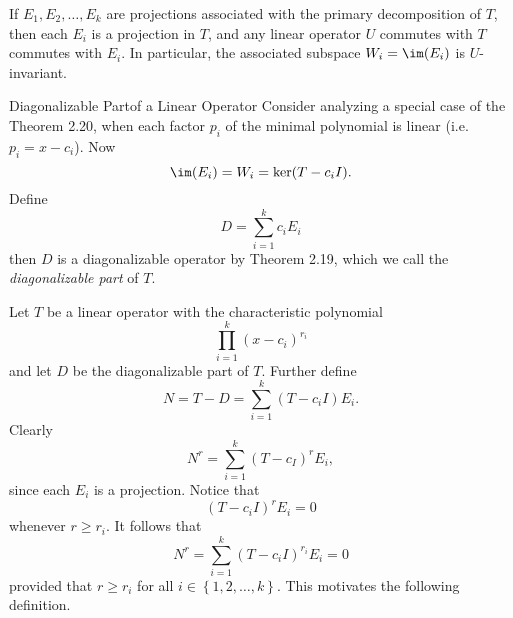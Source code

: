 \documentclass[math_245.tex]{subfiles}
\begin{document}
    \begin{cor}{}
        If $E_1, E_2, \ldots, E_k$ are projections associated with the primary decomposition of $T$, then each $E_i$ is a projection in $T$, and any linear operator $U$ commutes with $T$ commutes with $E_i$. In particular, the associated subspace $W_i = \im(E_i)$ is $U$-invariant.
    \end{cor}	

    \begin{definition}{Diagonalizable Part}{of a Linear Operator}
        Consider analyzing a special case of the Theorem 2.20, when each factor $p_i$ of the minimal polynomial is linear (i.e. $p_i = x-c_i$). Now
        \begin{equation*}
            \im(E_i) = W_i = \ker(T-c_iI).
        \end{equation*}
        Define
        \begin{equation*}
            D = \sum^{k}_{i=1} c_iE_i
        \end{equation*}
        then $D$ is a diagonalizable operator by Theorem 2.19, which we call the \emph{diagonalizable part} of $T$.
    \end{definition}

    \begin{remark}
        Let $T$ be a linear operator with the characteristic polynomial
        \begin{equation*}
            \prod^{k}_{i=1} (x-c_i)^{r_i}
        \end{equation*}
        and let $D$ be the diagonalizable part of $T$. Further define
        \begin{equation*}
            N = T - D = \sum^{k}_{i=1} (T-c_iI)E_i.
        \end{equation*}
        Clearly
        \begin{equation*}
            N^r = \sum^{k}_{i=1} (T-c_I)^rE_i,
        \end{equation*}
        since each $E_i$ is a projection. Notice that
        \begin{equation*}
            (T-c_iI)^rE_i = 0
        \end{equation*}
        whenever $r\geq r_i$. It follows that
        \begin{equation*}
            N^r = \sum^{k}_{i=1} \left( T-c_iI \right) ^{r_i} E_i = 0 
        \end{equation*}
        provided that $r\geq r_i$ for all $i\in \left\lbrace 1, 2, \ldots, k \right\rbrace$. This motivates the following definition.
    \end{remark}
\end{document}
